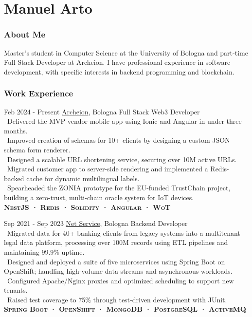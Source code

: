 \documentclass{tccv}
\begin{document}
\part{Manuel Arto}

\section{About Me}

Master's student in Computer Science at the University of Bologna and part-time Full Stack Developer at Archeion.\newline
I have professional experience in software development, with specific interests in backend programming and blockchain. 

\section{Work Experience}

\begin{eventlist}

     \item{Feb 2024 - Present}
     {\href{https://archeion.tech/}{Archeion}, Bologna}
     {Full Stack Web3 Developer} \\
     \textbullet~Delivered the MVP vendor mobile app using Ionic and Angular in under three months.\\
     \textbullet~Improved creation of schemas for 10+ clients by designing a custom JSON schema form renderer. \\
     \textbullet~Designed a scalable URL shortening service, securing over 10M active URLs. \\
     \textbullet~Migrated customer app to server-side rendering and implemented a Redis-backed cache for dynamic multilingual labels.\\
     \textbullet~Spearheaded the ZONIA prototype for the EU-funded TrustChain project, building a zero-trust, multi-chain oracle system for IoT devices.\\
     \textbf{\textsc{NestJS · Redis · Solidity · Angular · WoT}}

     \item{Sep 2021 - Sep 2023}
     {\href{https://www.netservice.eu/}{Net Service}, Bologna}
     {Backend Developer} \\
     \textbullet~Migrated data for 40+ banking clients from legacy systems into a multitenant legal data platform, processing over 100M records using ETL pipelines and maintaining 99.9\% uptime. \\
     \textbullet~Designed and deployed a suite of five microservices using Spring Boot on OpenShift; handling high-volume data streams and asynchronous workloads.\\
     \textbullet~Configured Apache/Nginx proxies and optimized scheduling to support new tenants. \\
     \textbullet~Raised test coverage to 75\% through test-driven development with JUnit.\\
     \textbf{\textsc{Spring Boot · OpenShift · MongoDB · PostgreSQL · ActiveMQ}}

\end{eventlist}
\end{document}
